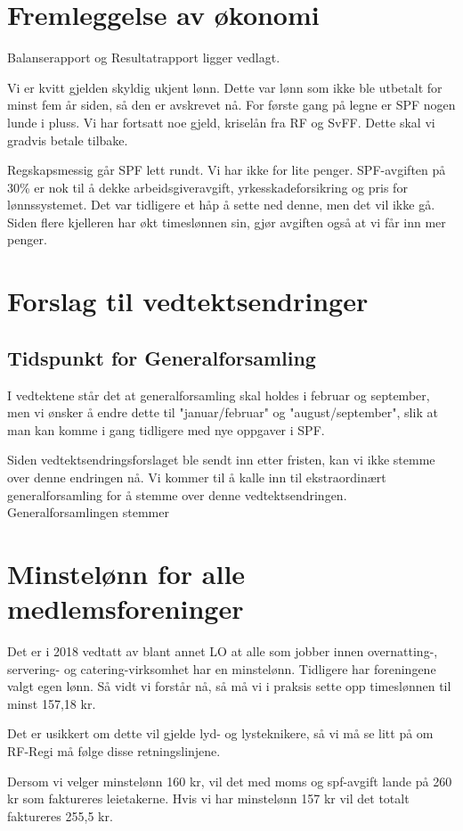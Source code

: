 \documentclass[a4paper,norsk]{article}
\begin{document}
\section{Fremleggelse av økonomi}
Balanserapport og Resultatrapport ligger vedlagt.

Vi er kvitt gjelden skyldig ukjent lønn. Dette var lønn som ikke ble utbetalt for minst fem år siden, så den er avskrevet nå. For første gang på legne er SPF nogen lunde i pluss. Vi har fortsatt noe gjeld, kriselån fra RF og SvFF. Dette skal vi gradvis betale tilbake. 

Regskapsmessig går SPF lett rundt. Vi har ikke for lite penger. SPF-avgiften på 30\% er nok til å dekke arbeidsgiveravgift, yrkesskadeforsikring og pris for lønnssystemet. Det var tidligere et håp å sette ned denne, men det vil ikke gå. Siden flere kjelleren har økt timeslønnen sin, gjør avgiften også at vi får inn mer penger.

\section{Forslag til vedtektsendringer}
\subsection{Tidspunkt for Generalforsamling}
I vedtektene står det at generalforsamling skal holdes i februar og september, men vi ønsker å endre dette til "januar/februar" og "august/september", slik at man kan komme i gang tidligere med nye oppgaver i SPF.

Siden vedtektsendringsforslaget ble sendt inn etter fristen, kan vi ikke stemme over denne endringen nå. Vi kommer til å kalle inn til ekstraordinært generalforsamling for å stemme over denne vedtektsendringen. Generalforsamlingen stemmer 

\section{Minstelønn for alle medlemsforeninger} 
Det er i 2018 vedtatt av blant annet LO at alle som jobber innen overnatting-, servering- og catering-virksomhet har en minstelønn. Tidligere har foreningene valgt egen lønn. Så vidt vi forstår nå, så må vi i praksis sette opp timeslønnen  til minst 157,18 kr. 

Det er usikkert om dette vil gjelde lyd- og lysteknikere, så vi må se litt på om RF-Regi må følge disse retningslinjene.

Dersom vi velger minstelønn 160 kr, vil det med moms og spf-avgift lande på 260 kr som faktureres leietakerne. Hvis vi har minstelønn 157 kr vil det totalt faktureres 255,5 kr. 
\end{document}
